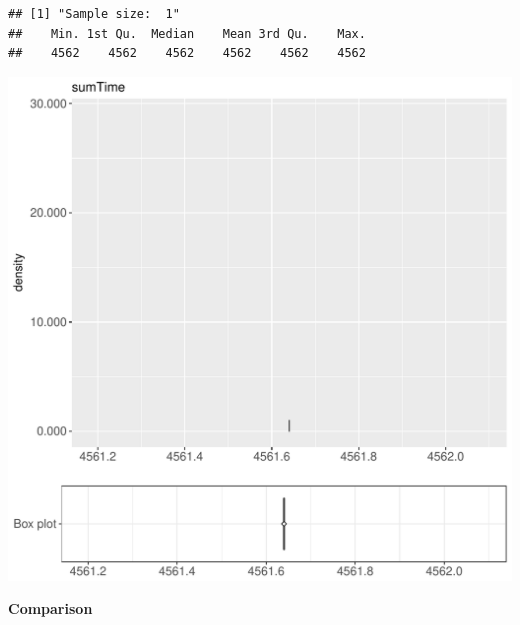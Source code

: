 \documentclass{article}\usepackage[]{graphicx}\usepackage[]{color}
\makeatletter
\def\maxwidth{ %
  \ifdim\Gin@nat@width>\linewidth
    \linewidth
  \else
    \Gin@nat@width
  \fi
}
\newenvironment{kframe}{%
 \def\at@end@of@kframe{}%
 \ifinner\ifhmode%
  \def\at@end@of@kframe{\end{minipage}}%
  \begin{minipage}{\columnwidth}%
 \fi\fi%
 \def\FrameCommand##1{\hskip\@totalleftmargin \hskip-\fboxsep
 \colorbox{shadecolor}{##1}\hskip-\fboxsep
     \hskip-\linewidth \hskip-\@totalleftmargin \hskip\columnwidth}%
 \MakeFramed {\advance\hsize-\width
   \@totalleftmargin\z@ \linewidth\hsize
   \@setminipage}}%
 {\par\unskip\endMakeFramed%
 \at@end@of@kframe}
\newenvironment{knitrout}{}{} %
\makeatother
\begin{document}
\begin{knitrout}
\color{fgcolor}\begin{kframe}
\begin{verbatim}
## [1] "Sample size:  1"
##    Min. 1st Qu.  Median    Mean 3rd Qu.    Max. 
##    4562    4562    4562    4562    4562    4562
\end{verbatim}


{\ttfamily\noindent\bfseries{}}\end{kframe}
\includegraphics[width=\maxwidth]{figure/RH3_noCache_big-1} 

\end{knitrout}
  
 \textbf{Comparison}
  
\end{document}
